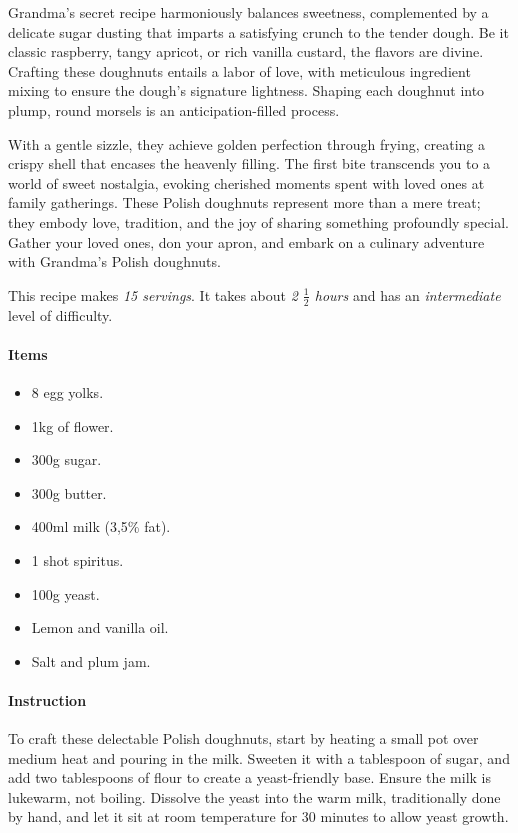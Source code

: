 Grandma's secret recipe harmoniously balances sweetness, complemented by a delicate sugar dusting that imparts a satisfying crunch to the tender dough. Be it classic raspberry, tangy apricot, or rich vanilla custard, the flavors are divine. Crafting these doughnuts entails a labor of love, with meticulous ingredient mixing to ensure the dough's signature lightness. Shaping each doughnut into plump, round morsels is an anticipation-filled process.

With a gentle sizzle, they achieve golden perfection through frying, creating a crispy shell that encases the heavenly filling. The first bite transcends you to a world of sweet nostalgia, evoking cherished moments spent with loved ones at family gatherings. These Polish doughnuts represent more than a mere treat; they embody love, tradition, and the joy of sharing something profoundly special. Gather your loved ones, don your apron, and embark on a culinary adventure with Grandma's Polish doughnuts.

This recipe makes \emph{15 servings}. It takes about \emph{2 $\frac{1}{2}$ hours} and has an \emph{intermediate} level of difficulty. 

\paragraph{Items}
\begin{itemize}[noitemsep]
    \item[\ding{182}] 8 egg yolks.
    \item[\ding{183}] 1kg of flower.
    \item[\ding{184}] 300g sugar.
    \item[\ding{185}] 300g butter.
    \item[\ding{186}] 400ml milk (3,5\% fat).
    \item[\ding{187}] 1 shot spiritus.
    \item[\ding{188}] 100g yeast.
    \item[\ding{189}] Lemon and vanilla oil.
    \item[\ding{190}] Salt and plum jam.
\end{itemize}

\paragraph{Instruction}
To craft these delectable Polish doughnuts, start by heating a small pot over medium heat and pouring in the milk. Sweeten it with a tablespoon of sugar, and add two tablespoons of flour to create a yeast-friendly base. Ensure the milk is lukewarm, not boiling. Dissolve the yeast into the warm milk, traditionally done by hand, and let it sit at room temperature for 30 minutes to allow yeast growth.

